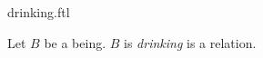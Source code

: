 \documentclass{stex}
\begin{document}
\begin{smodule}{drinking.ftl}



\begin{signature*}[forthel,for=drinking]
  Let $B$ be a being.
  $B$ is \emph{drinking} is a relation.
\end{signature*}

\end{smodule}
\end{document}
